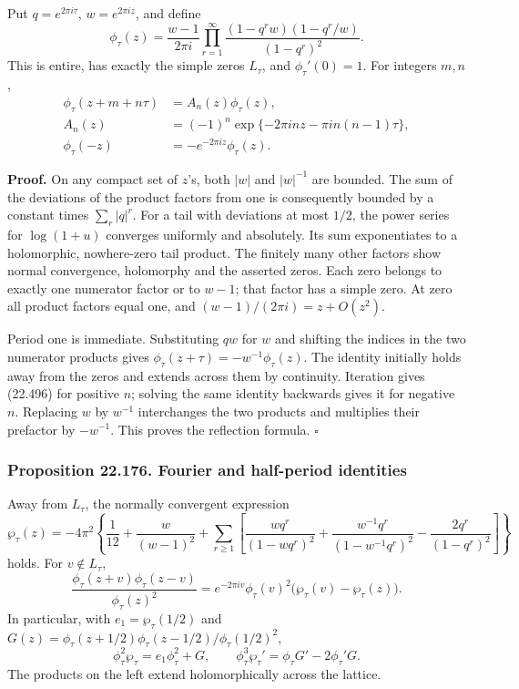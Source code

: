 \documentclass[
  11pt,
  a4paper,
]{article}
\begin{document}
Put \(q=e^{2\pi i\tau}\), \(w=e^{2\pi iz}\), and define \[
 \phi_\tau(z)=\frac{w-1}{2\pi i}
 \prod_{r=1}^{\infty}
 \frac{(1-q^rw)(1-q^r/w)}{(1-q^r)^2}.
 \tag{22.495}
\] This is entire, has exactly the simple zeros \(L_\tau\), and
\(\phi_\tau'(0)=1\). For integers \(m,n\), \[
 \begin{split}
 \phi_\tau(z+m+n\tau)&=A_n(z)\phi_\tau(z),\\
 A_n(z)&=(-1)^n
  \exp\{-2\pi inz-\pi in(n-1)\tau\},\\
 \phi_\tau(-z)&=-e^{-2\pi iz}\phi_\tau(z).
 \end{split}
 \tag{22.496}
\]

\textbf{Proof.} On any compact set of \(z\)'s, both \(|w|\) and
\(|w|^{-1}\) are bounded. The sum of the deviations of the product
factors from one is consequently bounded by a constant times
\(\sum_r|q|^r\). For a tail with deviations at most \(1/2\), the power
series for \(\log(1+u)\) converges uniformly and absolutely. Its sum
exponentiates to a holomorphic, nowhere-zero tail product. The finitely
many other factors show normal convergence, holomorphy and the asserted
zeros. Each zero belongs to exactly one numerator factor or to \(w-1\);
that factor has a simple zero. At zero all product factors equal one,
and \((w-1)/(2\pi i)=z+O(z^2)\).

Period one is immediate. Substituting \(qw\) for \(w\) and shifting the
indices in the two numerator products gives
\(\phi_\tau(z+\tau)=-w^{-1}\phi_\tau(z)\). The identity initially holds
away from the zeros and extends across them by continuity. Iteration
gives (22.496) for positive \(n\); solving the same identity backwards
gives it for negative \(n\). Replacing \(w\) by \(w^{-1}\) interchanges
the two products and multiplies their prefactor by \(-w^{-1}\). This
proves the reflection formula. \(\square\)

\subsubsection{Proposition 22.176. Fourier and half-period
identities}\label{proposition-22.176.-fourier-and-half-period-identities}

Away from \(L_\tau\), the normally convergent expression \[
 \wp_\tau(z)=-4\pi^2\left\{
 \frac1{12}+\frac{w}{(w-1)^2}
 +\sum_{r\ge1}\left[
 \frac{wq^r}{(1-wq^r)^2}
 +\frac{w^{-1}q^r}{(1-w^{-1}q^r)^2}
 -\frac{2q^r}{(1-q^r)^2}\right]\right\}
 \tag{22.497}
\] holds. For \(v\notin L_\tau\), \[
 \frac{\phi_\tau(z+v)\phi_\tau(z-v)}{\phi_\tau(z)^2}
 =e^{-2\pi iv}\phi_\tau(v)^2
       \bigl(\wp_\tau(v)-\wp_\tau(z)\bigr).
 \tag{22.498}
\] In particular, with \(e_1=\wp_\tau(1/2)\) and
\(G(z)=\phi_\tau(z+1/2)\phi_\tau(z-1/2)/\phi_\tau(1/2)^2\), \[
 \phi_\tau^2\wp_\tau=e_1\phi_\tau^2+G,
 \qquad
 \phi_\tau^3\wp_\tau'=\phi_\tau G'-2\phi_\tau'G.
 \tag{22.499}
\] The products on the left extend holomorphically across the lattice.
\end{document}
